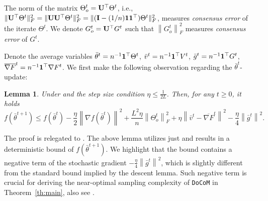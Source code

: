 \documentclass[10pt]{article} %
\theoremstyle{plain}
\newtheorem{lemma}[theorem]{Lemma}
\theoremstyle{definition}
\theoremstyle{remark}
\newcommand{\aname}{{\tt DoCoM}}
\newcommand{\prm}{\theta}
\newcommand{\grdF}{\nabla F}
\newcommand{\avgg}{\bar{g}}
\newcommand{\avgtheta}{\bar{\prm}}
\newcommand{\norm}[1]{\left\| #1 \right\|}
\newcommand{\avggrdF}{\overline{\nabla F}}
\newcommand{\avgv}{\bar{v}}
\begin{document}
The norm of the matrix $\Theta_o^t = {\bf U}^\top \Theta^t$, i.e., $\|{\bf U}^\top \Theta^t\|_F^2 = \|{\bf U}{\bf U}^\top \Theta^t\|_F^2 = \| ({\bf I} - (1/n){\bf 1}{\bf 1}^\top) \Theta^t \|_F^2$, measures \emph{consensus error} of the iterate $\Theta^t$. 
We denote $G_o^t = {\bf U}^\top G^t$ such that $\norm{G_o^t}_F^2$ measures \emph{consensus error} of $G^t$.

Denote the average variables $\avgtheta^t = n^{-1} {\bf 1}^\top \Theta^t$, $\avgv^t = n^{-1} {\bf 1}^\top V^t$, $\avgg^t = n^{-1} {\bf 1}^\top G^t$, $\avggrdF^t = n^{-1} {\bf 1}^\top \grdF^t$. 
We first make the following observation regarding the $\avgtheta^t$-update:
\begin{lemma} \label{lem:f_1stepnew} Under  and the step size condition $\eta \leq \frac{1}{2L}$. Then, for any $t \geq 0$, it holds \vspace{-.0cm}
\begin{equation}
    f( \avgtheta^{t+1} ) \leq f( \avgtheta^t )   - \frac{\eta}{2} \norm{ \nabla f( \avgtheta^t ) }^2 + \frac{ L^2 \eta }{n} \norm{ \Theta_o^t }_F^2 + \eta \norm{ \avgv^t - \avggrdF^t}^2 - \frac{\eta}{4} \norm{\avgg^t}^2. \label{eq:f_1stepnew}
\end{equation}
\end{lemma} 
The proof is relegated to . 
The above lemma utilizes just  and results in a deterministic bound of $f( \avgtheta^{t+1})$. 
We highlight that the bound contains a negative term of the stochastic gradient $- \frac{\eta}{4} \norm{\avgg^t}^2$, which is slightly different from the standard bound implied by the descent lemma. Such negative term is crucial for deriving the near-optimal sampling complexity of {\aname} in Theorem~\ref{th:main}, also see \citep{cutkosky2019momentum}.
\end{document}
